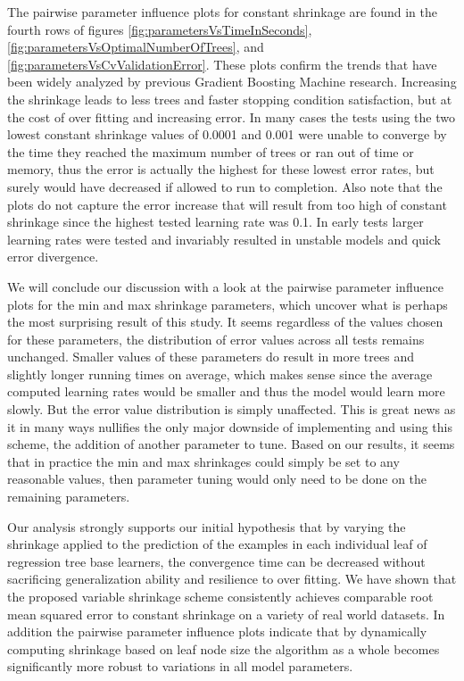 \documentclass[9pt, conference]{IEEEtran}
\begin{document}
The pairwise parameter influence plots for constant shrinkage are found in the fourth rows of figures \ref{fig:parametersVsTimeInSeconds},
\ref{fig:parametersVsOptimalNumberOfTrees}, and
\ref{fig:parametersVsCvValidationError}. These plots confirm the trends that have been widely analyzed by previous Gradient Boosting Machine research. Increasing the shrinkage leads to less trees and faster stopping condition satisfaction, but at the cost of over fitting and increasing error. In many cases the tests using the two lowest constant shrinkage values of 0.0001 and 0.001 were unable to converge by the time they reached the maximum number of trees or ran out of time or memory, thus the error is actually the highest for these lowest error rates, but surely would have decreased if allowed to run to completion. Also note that the plots do not capture the error increase that will result from too high of constant shrinkage since the highest tested learning rate was 0.1. In early tests larger learning rates were tested and invariably resulted in unstable models and quick error divergence.

We will conclude our discussion with a look at the pairwise parameter influence plots for the min and max shrinkage parameters, which uncover what is perhaps the most surprising result of this study. It seems regardless of the values chosen for these parameters, the distribution of error values across all tests remains unchanged. Smaller values of these parameters do result in more trees and slightly longer running times on average, which makes sense since the average computed learning rates would be smaller and thus the model would learn more slowly. But the error value distribution is simply unaffected. This is great news as it in many ways nullifies the only major downside of implementing and using this scheme, the addition of another parameter to tune. Based on our results, it seems that in practice the min and max shrinkages could simply be set to any reasonable values, then parameter tuning would only need to be done on the remaining parameters. 

Our analysis strongly supports our initial hypothesis that by varying the shrinkage applied to the prediction of the examples in each individual leaf of regression tree base learners, the convergence time can be decreased without sacrificing generalization ability and resilience to over fitting. We have shown that the proposed variable shrinkage scheme consistently achieves comparable root mean squared error to constant shrinkage on a variety of real world datasets. In addition the pairwise parameter influence plots indicate that by dynamically computing shrinkage based on leaf node size the algorithm as a whole becomes significantly more robust to variations in all model parameters. 
\end{document}
